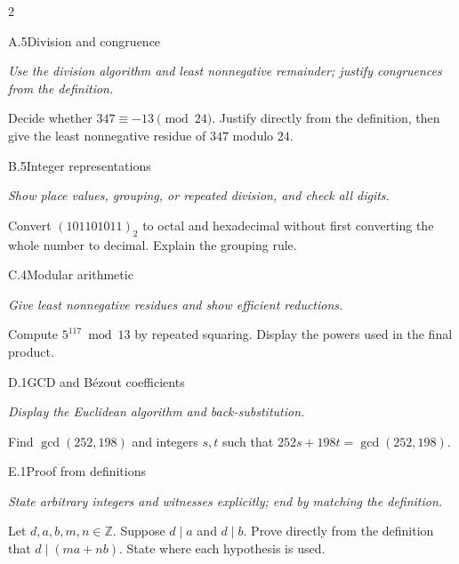 \documentclass[9pt]{extarticle}
\begin{document}
\begin{multicols}{2}
\begin{CoreProblem}{A.5}{Division and congruence}
{\scriptsize\textit{Use the division algorithm and least nonnegative remainder; justify congruences from the definition.}\par}
Decide whether $347\equiv-13\pmod{24}$. Justify directly from the definition,
then give the least nonnegative residue of $347$ modulo $24$.
\end{CoreProblem}
\begin{CoreProblem}{B.5}{Integer representations}
{\scriptsize\textit{Show place values, grouping, or repeated division, and check all digits.}\par}
Convert $(101101011)_2$ to octal and hexadecimal without first converting the
whole number to decimal. Explain the grouping rule.
\end{CoreProblem}
\begin{CoreProblem}{C.4}{Modular arithmetic}
{\scriptsize\textit{Give least nonnegative residues and show efficient reductions.}\par}
Compute $5^{117}\bmod13$ by repeated squaring. Display the powers used in the
final product.
\end{CoreProblem}
\columnbreak
\begin{CoreProblem}{D.1}{GCD and B\'ezout coefficients}
{\scriptsize\textit{Display the Euclidean algorithm and back-substitution.}\par}
Find $\gcd(252,198)$ and integers $s,t$ such that
$252s+198t=\gcd(252,198)$.
\end{CoreProblem}
\begin{CoreProblem}{E.1}{Proof from definitions}
{\scriptsize\textit{State arbitrary integers and witnesses explicitly; end by matching the definition.}\par}
Let $d,a,b,m,n\in\mathbb Z$. Suppose $d\mid a$ and $d\mid b$. Prove directly
from the definition that $d\mid(ma+nb)$. State where each hypothesis is used.
\end{CoreProblem}
\end{multicols}
\CoreWorkArea
\FormBreak
{}
\end{document}
